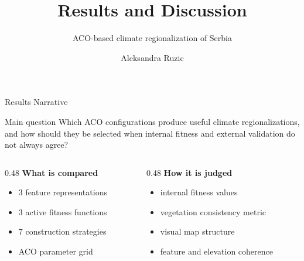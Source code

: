 \documentclass[aspectratio=169,10pt]{beamer}
\title[Results and Discussion]{Results and Discussion}
\subtitle{ACO-based climate regionalization of Serbia}
\author{Aleksandra Ruzic}
\date{}
\begin{document}
\begin{frame}
  \titlepage
\end{frame}

\begin{frame}{Results Narrative}
  \begin{block}{Main question}
    Which ACO configurations produce useful climate regionalizations, and how should they be selected when internal fitness and external validation do not always agree?
  \end{block}

  \vspace{0.5em}
  \begin{columns}[T]
    \begin{column}{0.48\textwidth}
      \textbf{What is compared}
      \begin{itemize}
        \item 3 feature representations
        \item 3 active fitness functions
        \item 7 construction strategies
        \item ACO parameter grid
      \end{itemize}
    \end{column}
    \begin{column}{0.48\textwidth}
      \textbf{How it is judged}
      \begin{itemize}
        \item internal fitness values
        \item vegetation consistency metric
        \item visual map structure
        \item feature and elevation coherence
      \end{itemize}
    \end{column}
  \end{columns}
\end{frame}
\end{document}
